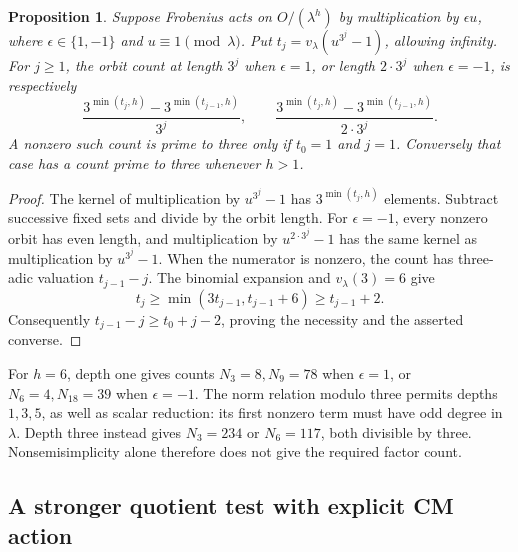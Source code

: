 \documentclass[11pt]{article}
\newtheorem{proposition}[theorem]{Proposition}
\theoremstyle{definition}
\theoremstyle{remark}
\begin{document}
\begin{proposition}\label{prop:kummer-cm-torsion-counts}
Suppose Frobenius acts on \(O/(\lambda^h)\) by multiplication
by \(\epsilon u\), where \(\epsilon\in\{1,-1\}\) and
\(u\equiv1\pmod\lambda\). Put
\(t_j=v_\lambda(u^{3^j}-1)\), allowing infinity.
For \(j\ge1\), the orbit count at length \(3^j\) when
\(\epsilon=1\), or length \(2\cdot3^j\) when
\(\epsilon=-1\), is respectively
\[
 \frac{3^{\min(t_j,h)}-3^{\min(t_{j-1},h)}}{3^j},
 \qquad
 \frac{3^{\min(t_j,h)}-3^{\min(t_{j-1},h)}}{2\cdot3^j}.
\]
A nonzero such count is prime to three only if
\(t_0=1\) and \(j=1\). Conversely that case has a count
prime to three whenever \(h>1\).
\end{proposition}
\begin{proof}
The kernel of multiplication by \(u^{3^j}-1\) has
\(3^{\min(t_j,h)}\) elements. Subtract successive fixed
sets and divide by the orbit length. For \(\epsilon=-1\),
every nonzero orbit has even length, and multiplication by
\(u^{2\cdot3^j}-1\) has the same kernel as multiplication
by \(u^{3^j}-1\).
When the numerator is nonzero, the count has three-adic
valuation \(t_{j-1}-j\). The binomial expansion and
\(v_\lambda(3)=6\) give
\[
 t_j\ge\min(3t_{j-1},t_{j-1}+6)\ge t_{j-1}+2.
\]
Consequently \(t_{j-1}-j\ge t_0+j-2\), proving the
necessity and the asserted converse.
\end{proof}

For \(h=6\), depth one gives counts \(N_3=8,N_9=78\)
when \(\epsilon=1\), or \(N_6=4,N_{18}=39\) when
\(\epsilon=-1\). The norm relation modulo three permits
depths \(1,3,5\), as well as scalar reduction: its first
nonzero term must have odd degree in \(\lambda\).
Depth three instead gives \(N_3=234\) or \(N_6=117\),
both divisible by three. Nonsemisimplicity alone therefore
does not give the required factor count.

\subsection{A stronger quotient test with explicit CM action}
\end{document}
